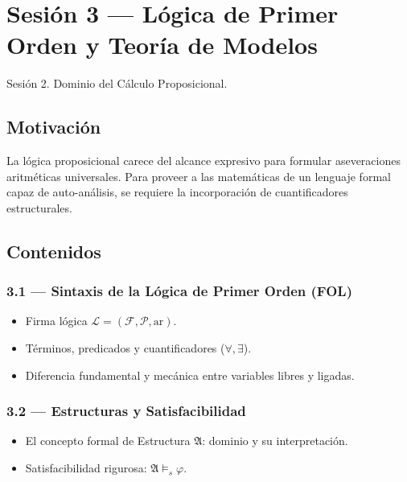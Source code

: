 \documentclass[11pt, letterpaper]{article}
\begin{document}
\newpage

\section{Sesi\'on 3 --- L\'ogica de Primer Orden y Teor\'ia de Modelos}

\begin{prereqs}
Sesi\'on 2. Dominio del C\'alculo Proposicional.
\end{prereqs}

\subsection*{Motivaci\'on}
La l\'ogica proposicional carece del alcance expresivo para formular aseveraciones aritm\'eticas universales. Para proveer a las matem\'aticas de un lenguaje formal capaz de auto-an\'alisis, se requiere la incorporaci\'on de cuantificadores estructurales.

\subsection{Contenidos}

\subsubsection{3.1 --- Sintaxis de la L\'ogica de Primer Orden (FOL)}
\begin{itemize}
  \item Firma l\'ogica $\mathcal{L}=(\mathcal{F},\mathcal{P},\text{ar})$.
  \item T\'erminos, predicados y cuantificadores ($\forall, \exists$). 
  \item Diferencia fundamental y mec\'anica entre variables libres y ligadas.
\end{itemize}

\subsubsection{3.2 --- Estructuras y Satisfacibilidad}
\begin{itemize}
  \item El concepto formal de Estructura $\mathfrak{A}$: dominio y su interpretaci\'on.
  \item Satisfacibilidad rigurosa: $\mathfrak{A}\models_s\varphi$.
\end{itemize}
\end{document}
